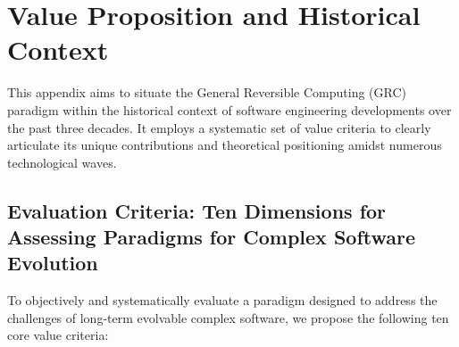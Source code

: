 \documentclass[11pt]{article}
\begin{document}
\section{Value Proposition and Historical Context}
\label{sec:value-context}

This appendix aims to situate the General Reversible Computing (GRC) paradigm within the historical context of software engineering developments over the past three decades. It employs a systematic set of value criteria to clearly articulate its unique contributions and theoretical positioning amidst numerous technological waves.

\subsection{Evaluation Criteria: Ten Dimensions for Assessing Paradigms for Complex Software Evolution}
\label{subsec:evaluation-criteria}

To objectively and systematically evaluate a paradigm designed to address the challenges of long-term evolvable complex software, we propose the following ten core value criteria:
\end{document}
